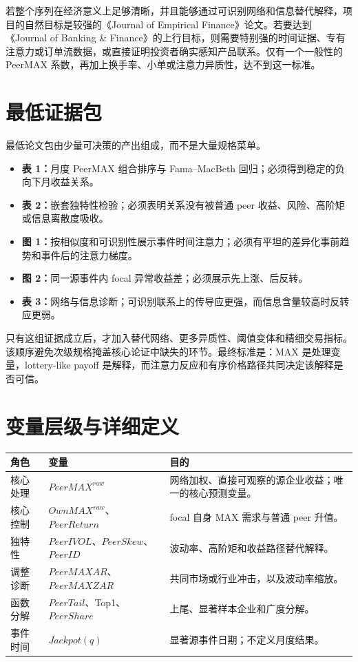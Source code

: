 \documentclass[UTF8,a4paper,11pt]{ctexart}
\begin{document}
若整个序列在经济意义上足够清晰，并且能够通过可识别网络和信息替代解释，项目的自然目标是较强的《Journal of Empirical Finance》论文。若要达到《Journal of Banking \& Finance》的上行目标，则需要特别强的时间证据、专有注意力或订单流数据，或直接证明投资者确实感知产品联系。仅有一个一般性的 PeerMAX 系数，再加上换手率、小单或注意力异质性，达不到这一标准。

\section{最低证据包}
最低论文包由少量可决策的产出组成，而不是大量规格菜单。

\begin{itemize}
\item \textbf{表 1：}月度 PeerMAX 组合排序与 Fama--MacBeth 回归；必须得到稳定的负向下月收益关系。
\item \textbf{表 2：}嵌套独特性检验；必须表明关系没有被普通 peer 收益、风险、高阶矩或信息离散度吸收。
\item \textbf{图 1：}按相似度和可识别性展示事件时间注意力；必须有平坦的差异化事前趋势和事件后的注意力梯度。
\item \textbf{图 2：}同一源事件内 focal 异常收益差；必须展示先上涨、后反转。
\item \textbf{表 3：}网络与信息诊断；可识别联系上的传导应更强，而信息含量较高时反转应更弱。
\end{itemize}

只有这组证据成立后，才加入替代网络、更多异质性、阈值变体和精细交易指标。该顺序避免次级规格掩盖核心论证中缺失的环节。最终标准是：MAX 是处理变量，lottery-like payoff 是解释，而注意力反应和有序价格路径共同决定该解释是否可信。

\appendix
\section{变量层级与详细定义}
\begin{longtable}{p{}p{}p{}}
\toprule
角色 & 变量 & 目的\\
\midrule
核心处理 & $PeerMAX^{raw}$ & 网络加权、直接可观察的源企业收益；唯一的核心预测变量。\\
核心控制 & $OwnMAX^{raw}$、$PeerReturn$ & focal 自身 MAX 需求与普通 peer 升值。\\
独特性 & $PeerIVOL$、$PeerSkew$、$PeerID$ & 波动率、高阶矩和收益路径替代解释。\\
调整诊断 & $PeerMAXAR$、$PeerMAXZAR$ & 共同市场或行业冲击，以及波动率缩放。\\
函数分解 & $PeerTail$、Top1、$PeerShare$ & 上尾、显著样本企业和广度分解。\\
事件时间 & $Jackpot(q)$ & 显著源事件日期；不定义月度结果。\\
\bottomrule
\end{longtable}
\end{document}
